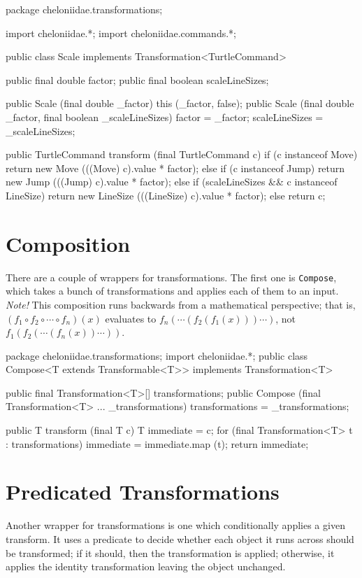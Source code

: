 \documentclass{report}
\begin{document}
\begin{javacode}
package cheloniidae.transformations;

import cheloniidae.*;
import cheloniidae.commands.*;

public class Scale implements Transformation<TurtleCommand> {
  public final double  factor;
  public final boolean scaleLineSizes;

  public Scale (final double _factor)                                {this (_factor, false);}
  public Scale (final double _factor, final boolean _scaleLineSizes) {factor = _factor; scaleLineSizes = _scaleLineSizes;}

  public TurtleCommand transform (final TurtleCommand c) {
    if                        (c instanceof Move)     return new Move     (((Move) c).value     * factor);
    else if                   (c instanceof Jump)     return new Jump     (((Jump) c).value     * factor);
    else if (scaleLineSizes && c instanceof LineSize) return new LineSize (((LineSize) c).value * factor);
    else                                              return c;
  }
}
\end{javacode}

\section {Composition} \label{sec:composition}
      There are a couple of wrappers for transformations. The first one is {\tt Compose}, which takes a bunch of transformations and applies each of them to an
      input. {\em Note!} This composition runs backwards from a mathematical perspective; that is, $(f_1 \circ f_2 \circ \cdots \circ f_n) (x)$ evaluates to
      $f_n (\cdots (f_2 (f_1 (x))) \cdots )$, not $f_1 (f_2 (\cdots (f_n (x)) \cdots ))$.

\begin{javacode}
package cheloniidae.transformations;
import cheloniidae.*;
public class Compose<T extends Transformable<T>> implements Transformation<T> {
  public final Transformation<T>[] transformations;
  public Compose (final Transformation<T> ... _transformations) {transformations = _transformations;}

  public T transform (final T c) {
    T immediate = c;
    for (final Transformation<T> t : transformations) immediate = immediate.map (t);
    return immediate;
  }
}
\end{javacode}

\section {Predicated Transformations} \label{sec:predicated-transformations}
      Another wrapper for transformations is one which conditionally applies a given transform. It uses a predicate to decide whether each object it runs across
      should be transformed; if it should, then the transformation is applied; otherwise, it applies the identity transformation leaving the object unchanged.
\end{document}
